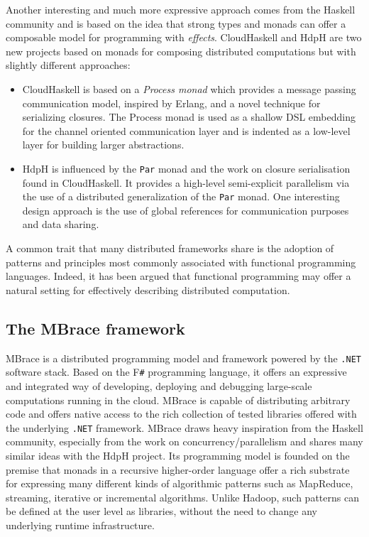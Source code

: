 \documentclass[9pt,a4paper]{article}
\newcommand{\Mbrace}{MBrace}
\newcommand{\TitularMbrace}{MBrace}
\newcommand{\fsharp}{F\texttt \#}
\newcommand{\dotnet}{\texttt{\hbox{.}NET}}
\begin{document}
Another interesting and much more expressive approach comes from the Haskell community and 
is based on the idea that strong types and monads can offer a composable model for
programming with \emph{effects}. CloudHaskell\cite{cloud-haskell} and HdpH\cite{HdpH} are 
two new projects based on monads for composing distributed computations but with slightly
different approaches:
%
\begin{itemize}
\item CloudHaskell is based on a \emph{Process monad} which provides a message passing 
communication model, inspired by Erlang, and a novel technique for serializing closures. 
The Process monad is used as a shallow DSL embedding for the channel oriented 
communication layer and is indented as a low-level layer for building larger 
abstractions.

\item HdpH is influenced by the \texttt{Par} monad\cite{par-monad} and the work on closure
serialisation found in CloudHaskell. It provides a high-level semi-explicit parallelism via 
the use of a distributed generalization of the \texttt{Par} monad. One interesting design
approach is the use of global references for communication purposes and data sharing.
\end{itemize}

A common trait that many distributed frameworks share is the adoption of patterns and
principles most commonly associated with functional programming languages. Indeed, 
it has been argued that functional programming may offer a natural setting for 
effectively describing distributed computation.

\subsection{The \TitularMbrace{} framework}

\Mbrace{} is a distributed programming model and framework powered by the \dotnet{}
software stack. Based on the \fsharp{} programming language, it offers an expressive
and integrated way of developing, deploying and debugging large-scale computations
running in the cloud. \Mbrace{} is capable of distributing arbitrary code and
offers native access to the rich collection of tested libraries offered with the
underlying \dotnet{} framework. \Mbrace{} draws heavy inspiration from the Haskell 
community, especially from the work on concurrency/parallelism and shares many similar
ideas with the HdpH project. Its programming model is founded on the premise that monads 
in a recursive higher-order language offer a rich substrate for expressing many
different kinds of algorithmic patterns such as MapReduce, streaming\cite{ShmStreaming},
iterative\cite{HaLoop} or incremental\cite{IncMR} algorithms. Unlike Hadoop, such 
patterns can be defined at the user level as libraries, without the need to change any
underlying runtime infrastructure.
\end{document}
